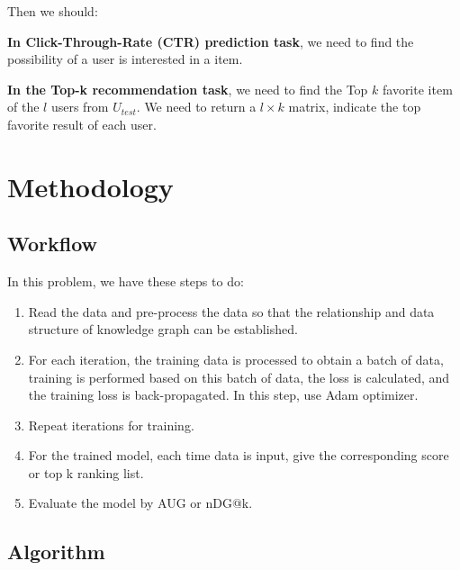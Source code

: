 \documentclass[lettersize,journal]{IEEEtran}
\begin{document}
Then we should:

\textbf{In Click-Through-Rate (CTR) prediction task}, we need to find the possibility of a user is interested in a item.

\textbf{In the Top-k recommendation task}, we need to find the Top $k$ favorite item of the $l$ users from $U_{test}$. We need to return a $l \times k$ matrix, indicate the top favorite result of each user.

\section{Methodology}

\subsection{Workflow}

In this problem, we have these steps to do:

\begin{enumerate}
    \item Read the data and pre-process the data so that the relationship and data structure of knowledge graph can be established.
    \item For each iteration, the training data is processed to obtain a batch of data, training is performed based on this batch of data, the loss is calculated, and the training loss is back-propagated. In this step, use Adam optimizer.
    \item Repeat iterations for training.
    \item For the trained model, each time data is input, give the corresponding score or top k ranking list.
    \item Evaluate the model by AUG or nDG@k.
\end{enumerate}

\subsection{Algorithm}
\end{document}
